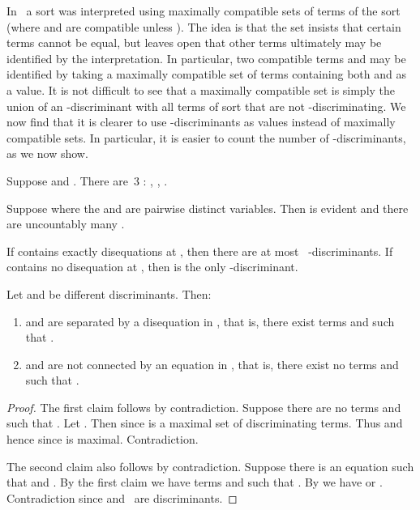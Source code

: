 In~\cite{Brown2004a} a sort was interpreted using
maximally compatible sets of terms of the sort (where  and 
are compatible unless ).
The idea is that the set  insists that certain terms cannot be
equal, but leaves open that other terms ultimately may be identified
by the interpretation.  In particular, two compatible terms  and  may be identified by
taking a maximally compatible set of terms containing both  and  as a value.
It is not difficult to see that a maximally compatible set is simply the union of an -discriminant
with all terms of sort  that are not -discriminating.
We now find that it is clearer to use -discriminants as values instead of maximally compatible sets.
In particular, it is easier to count the number of -discriminants, as we now show.


\begin{exa}
  Suppose  and
  .  There are~3
  : , ,
  .
\end{exa}


\begin{exa}
  Suppose  where
  the  and  are pairwise distinct variables.
  Then  is evident and there are uncountably many
  .
\end{exa}

\begin{prop}
  \label{prop-finite-discs}
  If  contains exactly  disequations at ,
  then there are at most~ -discriminants.
  If  contains no disequation at , then
   is the only -discriminant.
\end{prop}

\begin{prop}
  \label{prop-diff-discs}
  Let  and  be different discriminants.
  Then:
  \begin{enumerate}[\em(1)]
  \item  and  are separated by a disequation
    in , that is, there exist terms  and
     such that .
  \item  and  are not connected by an
    equation in , that is, there exist no terms
     and  such that .
  \end{enumerate}
\end{prop}

\begin{proof}
  The first claim follows by contradiction.  Suppose
  there are no terms  and  such that
  .  Let .  Then  since 
  is a maximal set of discriminating terms.  Thus
   and hence  since  is maximal.
  Contradiction.

  The second claim also follows by contradiction.
  Suppose there is an equation  such
  that  and .  By the first
  claim we have terms  and 
  such that .  By \ECon we have  or .  Contradiction since 
  and~ are discriminants.
\end{proof}

